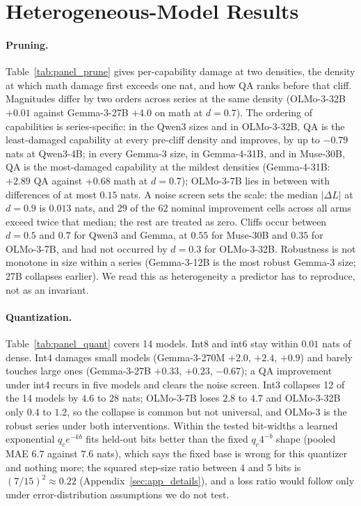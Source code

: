 \FloatBarrier
\section{Heterogeneous-Model Results}
\label{sec:app_hetero}


\paragraph{Pruning.} Table~\ref{tab:panel_prune} gives per-capability
damage at two densities, the density at which math damage first exceeds
one nat, and how QA ranks before that cliff. Magnitudes differ by two
orders across series at the same density (OLMo-3-32B $+0.01$ against
Gemma-3-27B $+4.0$ on math at $d=0.7$). The ordering of capabilities is
series-specific: in the Qwen3 sizes and in OLMo-3-32B, QA is the
least-damaged capability at every pre-cliff density and improves, by up
to $-0.79$ nats at Qwen3-4B; in every Gemma-3 size, in Gemma-4-31B,
and in Muse-30B, QA is the most-damaged capability at the mildest
densities (Gemma-4-31B: $+2.89$ QA against $+0.68$ math at $d=0.7$);
OLMo-3-7B lies in between with differences of at most $0.15$ nats. A
noise screen sets the scale: the median $|\Delta L|$ at $d=0.9$ is
$0.013$ nats, and 29 of the 62 nominal improvement cells across all
arms exceed twice that median; the rest are treated as zero. Cliffs
occur between $d=0.5$ and $0.7$ for Qwen3 and Gemma, at $0.55$ for
Muse-30B and $0.35$ for OLMo-3-7B, and had not occurred by $d=0.3$ for
OLMo-3-32B. Robustness is not monotone in size within a series
(Gemma-3-12B is the most robust Gemma-3 size; 27B collapses earlier).
We read this as heterogeneity a predictor has to reproduce, not as an
invariant.

\paragraph{Quantization.} Table~\ref{tab:panel_quant} covers
14 models. Int8 and int6 stay within $0.01$ nats of dense. Int4
damages small models (Gemma-3-270M $+2.0$, $+2.4$, $+0.9$) and barely
touches large ones (Gemma-3-27B $+0.33$, $+0.23$, $-0.67$); a QA
improvement under int4 recurs in five models and clears the noise
screen. Int3 collapses 12 of the 14 models by $4.6$ to $28$ nats;
OLMo-3-7B loses $2.8$ to $4.7$ and OLMo-3-32B only $0.4$ to $1.2$, so
the collapse is common but not universal, and OLMo-3 is the robust
series under both interventions. Within the tested bit-widths a learned
exponential $q_c e^{-kb}$ fits held-out bits better than the fixed
$q_c4^{-b}$ shape (pooled MAE $6.7$ against $7.6$ nats), which says the
fixed base is wrong for this quantizer and nothing more; the squared
step-size ratio between 4 and 5 bits is $(7/15)^2\approx0.22$
(Appendix~\ref{sec:app_details}), and a loss ratio would follow only
under error-distribution assumptions we do not test.

